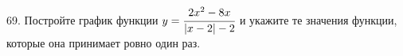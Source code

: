 69. Постройте график функции $y=\cfrac{2x^2-8x}{|x-2|-2}$ и укажите те значения функции, которые она принимает ровно один раз.\\
